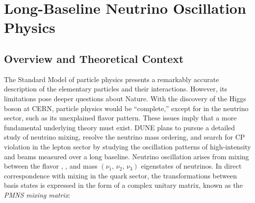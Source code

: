 \chapter{Long-Baseline Neutrino Oscillation Physics}
\label{ch:physics-lbnosc}

\section{Overview and Theoretical Context} %
\label{sec:physics-lbnosc-context}

The Standard Model of particle physics 
presents a remarkably accurate
description of the elementary particles and their
interactions. However, its limitations pose deeper questions about
Nature. With the discovery of the Higgs boson at CERN, particle physics would be ``complete,''
 except
for %
  in the neutrino sector, such as its unexplained flavor pattern.  These issues  
imply that a more fundamental underlying theory must exist. 
DUNE plans to pursue a detailed
study of neutrino mixing, resolve the neutrino mass ordering,
and search for CP violation in the lepton sector  by
studying the oscillation patterns of high-intensity
\numu and \anumu %
beams measured over a long baseline. 
Neutrino oscillation arises from mixing between the flavor %
\nue, \numu, \nutau and mass $(\nu_1,\, \nu_2,\, \nu_3)$
eigenstates of neutrinos.
In direct correspondence with mixing in the quark sector, the transformations
between basis states is expressed in the form of a complex unitary
matrix, known as the \textit{PMNS mixing matrix}: 
